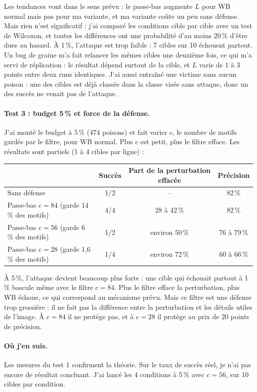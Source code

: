 Les tendances vont dans le sens prévu : le passe-bas augmente $L$ pour WB
normal mais pas pour ma variante, et ma variante coûte un peu sans
défense. Mais rien n'est significatif : j'ai comparé les conditions
cible par cible avec un test de Wilcoxon, et toutes les différences ont
une probabilité d'au moins 20\,\% d'être dues au hasard. À 1\,\%,
l'attaque est trop faible : 7 cibles sur 10 échouent partout. Un bug de
graine m'a fait relancer les mêmes cibles une deuxième fois, ce qui m'a
servi de réplication : le résultat dépend surtout de la cible, et $L$
varie de 1 à 3 points entre deux runs identiques. J'ai aussi entraîné une
victime sans aucun poison : une des cibles est déjà classée dans la
classe visée sans attaque, donc un des succès ne venait pas de l'attaque.

\paragraph{Test 3 : budget 5\,\% et force de la défense.}
J'ai monté le budget à 5\,\% (474 poisons) et fait varier $c$, le nombre
de motifs gardés par le filtre, pour WB normal. Plus $c$ est petit, plus
le filtre efface. Les résultats sont partiels (1 à 4 cibles par ligne) :

\begin{center}
\small
\begin{tabular}{@{}lccc@{}}
\toprule
& Succès & Part de la perturbation effacée & Précision \\
\midrule
Sans défense & 1/2 & -- & 82\,\% \\
Passe-bas $c=84$ (garde 14\,\% des motifs) & 4/4 & 28 à 42\,\% & 82\,\% \\
Passe-bas $c=56$ (garde 6\,\% des motifs) & 1/2 & environ 50\,\% & 76 à 79\,\% \\
Passe-bas $c=28$ (garde 1{,}6\,\% des motifs) & 1/4 & environ 72\,\% & 60 à 66\,\% \\
\bottomrule
\end{tabular}
\end{center}

À 5\,\%, l'attaque devient beaucoup plus forte : une cible qui échouait
partout à 1\,\% bascule même avec le filtre $c=84$. Plus le filtre efface
la perturbation, plus WB échoue, ce qui correspond au mécanisme prévu.
Mais ce filtre est une défense trop grossière : il ne fait pas la
différence entre la perturbation et les détails utiles de l'image. À
$c=84$ il ne protège pas, et à $c=28$ il protège au prix de 20 points de
précision.

\paragraph{Où j'en suis.}
Les mesures du test 1 confirment la théorie. Sur le taux de succès réel,
je n'ai pas encore de résultat concluant. J'ai lancé les 4 conditions à
5\,\% avec $c=56$, sur 10 cibles par condition.
